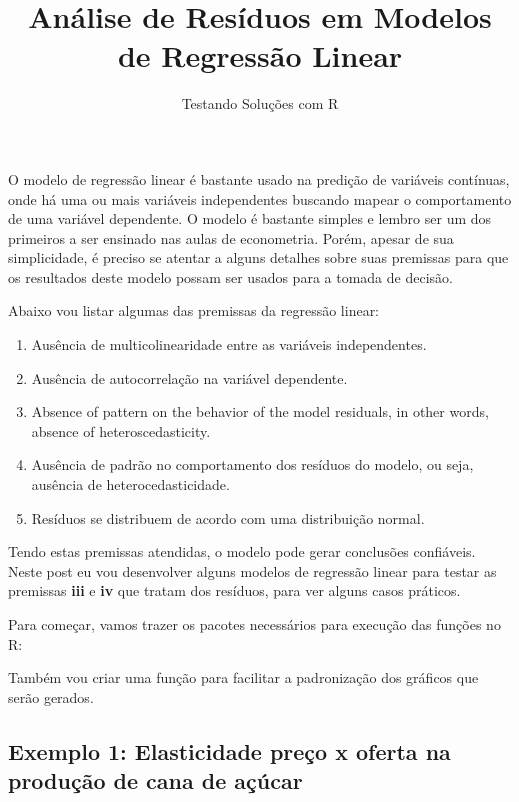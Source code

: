 \documentclass[
  12pt,
  a4paper,
]{article}
\title{Análise de Resíduos em Modelos de Regressão Linear}
\subtitle{Testando Soluções com R}
\author{}
\date{\vspace{-2.5em}}
\begin{document}
\maketitle

O modelo de regressão linear é bastante usado na predição de variáveis contínuas, onde há uma ou mais variáveis independentes buscando mapear o comportamento de uma variável dependente. O modelo é bastante simples e lembro ser um dos primeiros a ser ensinado nas aulas de econometria. Porém, apesar de sua simplicidade, é preciso se atentar a alguns detalhes sobre suas premissas para que os resultados deste modelo possam ser usados para a tomada de decisão.

Abaixo vou listar algumas das premissas da regressão linear:

\begin{enumerate}
\def\labelenumi{\roman{enumi})}
\item
  Ausência de multicolinearidade entre as variáveis independentes.
\item
  Ausência de autocorrelação na variável dependente.
\item
  Absence of pattern on the behavior of the model residuals, in other words, absence of heteroscedasticity.
\item
  Ausência de padrão no comportamento dos resíduos do modelo, ou seja, ausência de heterocedasticidade.
\item
  Resíduos se distribuem de acordo com uma distribuição normal.
\end{enumerate}

Tendo estas premissas atendidas, o modelo pode gerar conclusões confiáveis. Neste post eu vou desenvolver alguns modelos de regressão linear para testar as premissas \textbf{iii} e \textbf{iv} que tratam dos resíduos, para ver alguns casos práticos.

Para começar, vamos trazer os pacotes necessários para execução das funções no R:

Também vou criar uma função para facilitar a padronização dos gráficos que serão gerados.

\hypertarget{exemplo-1-elasticidade-preuxe7o-x-oferta-na-produuxe7uxe3o-de-cana-de-auxe7uxfacar}{%
\subsection{Exemplo 1: Elasticidade preço x oferta na produção de cana de açúcar}\label{exemplo-1-elasticidade-preuxe7o-x-oferta-na-produuxe7uxe3o-de-cana-de-auxe7uxfacar}}
\end{document}
